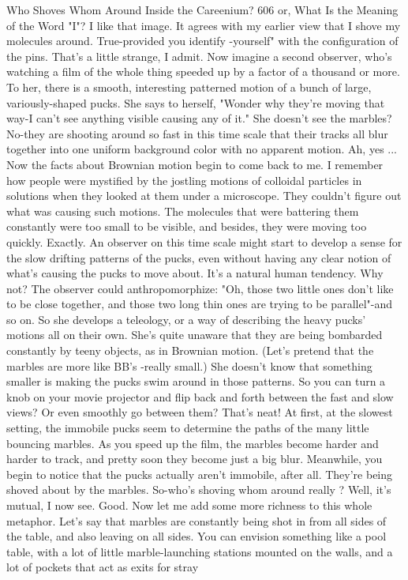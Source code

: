 Who Shoves Whom Around Inside the Careenium?                                        606
or, What Is the Meaning of the Word "I"?
\achilles I like that image. It agrees with my earlier view that I shove my
  molecules around.
\tortoise True-provided you identify -yourself" with the configuration of the pins.
\achilles That's a little strange, I admit.
\tortoise Now imagine a second observer, who's watching a film of the whole
  thing speeded up by a factor of a thousand or more. To her, there is a smooth,
  interesting patterned motion of a bunch of large, variously-shaped pucks. She says
  to herself, "Wonder why they're moving that way-I can't see anything visible
  causing any of it."
\achilles She doesn't see the marbles?
\tortoise No-they are shooting around so fast in this time scale that their tracks all
  blur together into one uniform background color with no apparent motion.
\achilles Ah, yes ... Now the facts about Brownian motion begin to come back to
  me. I remember how people were mystified by the jostling motions of colloidal
  particles in solutions when they looked at them under a microscope. They couldn't
  figure out what was causing such motions. The molecules that were battering them
  constantly were too small to be visible, and besides, they were moving too quickly.
\tortoise Exactly. An observer on this time scale might start to develop a sense for
  the slow drifting patterns of the pucks, even without having any clear notion of
  what's causing the pucks to move about.
\achilles It's a natural human tendency. Why not?
\tortoise The observer could anthropomorphize: "Oh, those two little ones don't
  like to be close together, and those two long thin ones are trying to be parallel"-and
  so on. So she develops a teleology, or a way of describing the heavy pucks'
  motions all on their own. She's quite unaware that they are being bombarded
  constantly by teeny objects, as in Brownian motion. (Let's pretend that the marbles
  are more like BB's -really small.) She doesn't know that something smaller is
  making the pucks swim around in those patterns.
\achilles So you can turn a knob on your movie projector and flip back and forth
  between the fast and slow views? Or even smoothly go between them? That's neat!
  At first, at the slowest setting, the immobile pucks seem to determine the paths of
  the many little bouncing marbles. As you speed up the film, the marbles become
  harder and harder to track, and pretty soon they become just a big blur. Meanwhile,
  you begin to notice that the pucks actually aren't immobile, after all. They're being
  shoved about by the marbles. So-who's shoving whom around really ? Well, it's
  mutual, I now see.
\tortoise Good. Now let me add some more richness to this whole metaphor. Let's
  say that marbles are constantly being shot in from all sides of the table, and also
  leaving on all sides. You can envision something like a pool table, with a lot of
  little marble-launching stations mounted on the walls, and a lot of pockets that act
  as exits for stray




